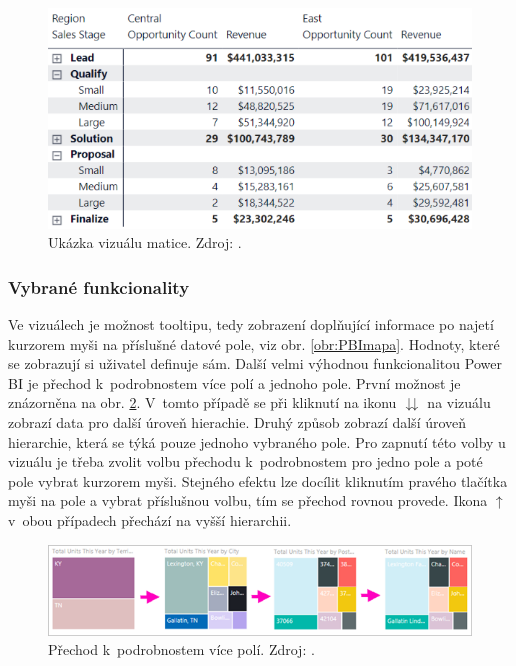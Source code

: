 \begin{figure}[hbtp!]
\begin{minipage}{.4\textwidth}
        \includegraphics[width=\textwidth]{obrazky/PBIteorie/power-bi-expansion-state.png}
        \caption{Ukázka vizuálu matice. Zdroj: \cite{bib:PBI}.}
        \label{obr:PBItab.}
    \end{minipage}
\end{figure}

\subsubsection*{Vybrané funkcionality}

Ve vizuálech je možnost tooltipu, tedy zobrazení doplňující informace po najetí kurzorem myši na příslušné datové pole, viz obr. \ref*{obr:PBImapa}. Hodnoty, které se zobrazují si uživatel definuje sám. Další velmi výhodnou funkcionalitou Power BI je přechod k~podrobnostem více polí a jednoho pole. První možnost je znázorněna na obr.     \ref*{obr:PBIdrillall}. V~tomto případě se při kliknutí na ikonu $\downdownarrows$ na vizuálu zobrazí data pro další úroveň hierachie. Druhý způsob zobrazí další úroveň hierarchie, která se týká pouze jednoho vybraného pole. Pro zapnutí této volby u vizuálu je třeba zvolit volbu přechodu k~podrobnostem pro jedno pole a poté pole vybrat kurzorem myši. Stejného efektu lze docílit kliknutím pravého tlačítka myši na pole a vybrat příslušnou volbu, tím se přechod rovnou provede. Ikona $\uparrow$ v~obou případech přechází na vyšší hierarchii.

\begin{figure}[h!]
    \centering
    \captionsetup{justification=centering}
    \includegraphics[width=.9\textwidth]{obrazky/PBIteorie/power-bi-drill-path.png}
    \caption{Přechod k~podrobnostem více polí. 
    Zdroj: \cite{bib:PBI}.}
    \label{obr:PBIdrillall}
\end{figure}

